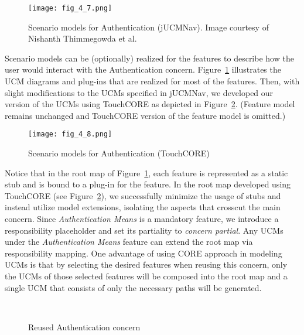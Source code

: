\begin{figure}
	\centering
	\texttt{[image: fig\_4\_7.png]}
	\caption[Scenario models for Authentication (jUCMNav)]{Scenario models for Authentication (jUCMNav). Image courtesy of Nishanth Thimmegowda et al.~\cite{thimmegowda2014concern}}
	\label{fig:4.7}
\end{figure}

Scenario models can be (optionally) realized for the features to describe how the user would interact with the Authentication concern. Figure~\ref{fig:4.7} illustrates the UCM diagrams and plug-ins that are realized for most of the features. Then, with slight modifications to the UCMs specified in jUCMNav, we developed our version of the UCMs using TouchCORE as depicted in Figure~\ref{fig:4.8}. (Feature model remains unchanged and TouchCORE version of the feature model is omitted.)

\begin{figure}
	\centering
	\texttt{[image: fig\_4\_8.png]}
	\caption{Scenario models for Authentication (TouchCORE)}
	\label{fig:4.8}
\end{figure}

Notice that in the root map of Figure~\ref{fig:4.7}, each feature is represented as a static stub and is bound to a plug-in for the feature. In the root map developed using TouchCORE (see Figure~\ref{fig:4.8}), we successfully minimize the usage of stubs and instead utilize model extensions, isolating the aspects that crosscut the main concern. Since \emph{Authentication Means} is a mandatory feature, we introduce a responsibility placeholder and set its partiality to \emph{concern partial}. Any UCMs under the \emph{Authentication Means} feature can extend the root map via responsibility mapping. One advantage of using CORE approach in modeling UCMs is that by selecting the desired features when reusing this concern, only the UCMs of those selected features will be composed into the root map and a single UCM that consists of only the necessary paths will be generated.

\begin{figure}
	\centering
	 \\
	\caption{Reused Authentication concern}
	\label{fig:4.9}
\end{figure}

